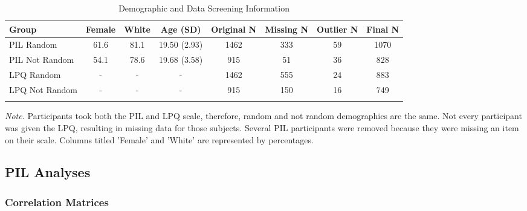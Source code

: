 \documentclass[english,man]{apa6}
\theoremstyle{definition}
\theoremstyle{definition}
\theoremstyle{definition}
\theoremstyle{remark}
\begin{document}
\begin{table}[tbp]
\begin{center}
\begin{threeparttable}
\caption{\label{tab:demo-table}Demographic and Data Screening Information}
\small{
\begin{tabular}{lccccccc}
\toprule
Group & \multicolumn{1}{c}{Female} & \multicolumn{1}{c}{White} & \multicolumn{1}{c}{Age (SD)} & \multicolumn{1}{c}{Original N} & \multicolumn{1}{c}{Missing N} & \multicolumn{1}{c}{Outlier N} & \multicolumn{1}{c}{Final N}\\
\midrule
PIL Random & 61.6 & 81.1 & 19.50 (2.93) & 1462 & 333 & 59 & 1070\\
PIL Not Random & 54.1 & 78.6 & 19.68 (3.58) & 915 & 51 & 36 & 828\\
LPQ Random & - & - & - & 1462 & 555 & 24 & 883\\
LPQ Not Random & - & - & - & 915 & 150 & 16 & 749\\
\bottomrule
\addlinespace
\end{tabular}
}
\begin{tablenotes}[para]
\textit{Note.} Participants took both the PIL and LPQ scale, therefore, random and not random demographics are the same. Not every participant was given the LPQ, resulting in missing data for those subjects. Several PIL participants were removed because they were missing an item on their scale. Columns titled 'Female' and 'White' are represented by percentages.
\end{tablenotes}
\end{threeparttable}
\end{center}
\end{table}

\subsection{PIL Analyses}\label{pil-analyses}

\subsubsection{Correlation Matrices}\label{correlation-matrices}
\end{document}
